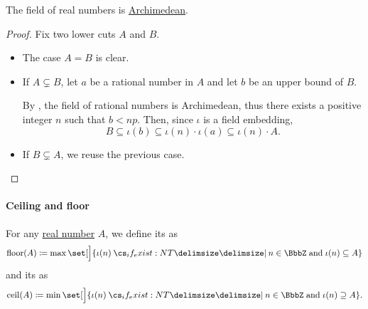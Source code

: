 \begin{proposition}\label{thm:real_numbers_archimedean}
  The field of real numbers is \hyperref[def:archimedean_semiring]{Archimedean}.
\end{proposition}
\begin{proof}
  Fix two lower cuts \( A \) and \( B \).

  \begin{itemize}
    \item The case \( A = B \) is clear.

    \item If \( A \subsetneq B \), let \( a \) be a rational number in \( A \) and let \( b \) be an upper bound of \( B \).

    By , the field of rational numbers is Archimedean, thus there exists a positive integer \( n \) such that \( b < np \). Then, since \( \iota \) is a field embedding,
    \begin{equation*}
      B \subseteq \iota(b) \subseteq \iota(n) \cdot \iota(a) \subseteq \iota(n) \cdot A.
    \end{equation*}

    \item If \( B \subsetneq A \), we reuse the previous case.
  \end{itemize}
\end{proof}

\paragraph{Ceiling and floor}

\begin{definition}\label{def:real_floor_ceiling}\mimprovised
  For any \hyperref[def:real_numbers]{real number} \( A \), we define its  as
  \begin{equation*}
    \floor(A) \coloneqq \max\set[\Big]{ \iota(n) \given* n \in \BbbZ \T{and} \iota(n) \subseteq A }
  \end{equation*}
  and its  as
  \begin{equation*}
    \ceil(A) \coloneqq \min\set[\Big]{ \iota(n) \given* n \in \BbbZ \T{and} \iota(n) \supseteq A }.
  \end{equation*}
\end{definition}

